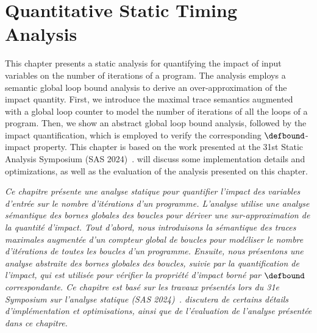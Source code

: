 
\setchapterpreamble[u]{\margintoc}

\chapter{Quantitative Static Timing Analysis}


\marginemptybox{6.8cm}

This chapter presents a static analysis for quantifying the impact of input variables on the number of iterations of a program.
The analysis employs a semantic global loop bound analysis to derive an over-approximation of the impact quantity.
First, we introduce the maximal trace semantics augmented with a global loop counter to model the number of iterations of all the loops of a program.
Then, we show an abstract global loop bound analysis, followed by the impact quantification, which is employed to verify the corresponding $\defbound$-impact property.
This chapter is based on the work presented at the 31st Static Analysis Symposium (SAS 2024)~.
 will discuss some implementation details and optimizations, as well as the evaluation of the analysis presented on this chapter.


\frenchdiv

\emph{Ce chapitre présente une analyse statique pour quantifier l'impact des variables d'entrée sur le nombre d'itérations d'un programme. L'analyse utilise une analyse sémantique des bornes globales des boucles pour dériver une sur-approximation de la quantité d'impact. Tout d'abord, nous introduisons la sémantique des traces maximales augmentée d'un compteur global de boucles pour modéliser le nombre d'itérations de toutes les boucles d'un programme. Ensuite, nous présentons une analyse abstraite des bornes globales des boucles, suivie par la quantification de l'impact, qui est utilisée pour vérifier la propriété d'impact borné par $\defbound$ correspondante. Ce chapitre est basé sur les travaux présentés lors du 31e Symposium sur l'analyse statique (SAS 2024)~\cite{Mazzucato2024c}.  discutera de certains détails d'implémentation et optimisations, ainsi que de l'évaluation de l'analyse présentée dans ce chapitre.}







